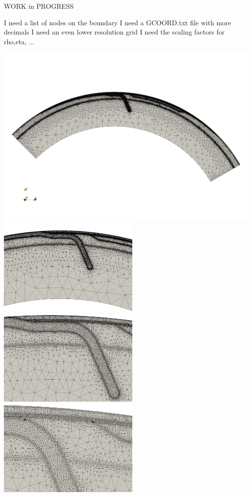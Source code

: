 

WORK in PROGRESS

I need a list of nodes on the boundary
I need a GCOORD.txt file with more decimals
I need an even lower resolution  grid
I need the scaling factors for rho,eta, ...


\includegraphics[width=14cm]{python_codes/fieldstone_44/grid_lowres1}\\
\includegraphics[width=7cm]{python_codes/fieldstone_44/grid_lowres2}
\includegraphics[width=7cm]{python_codes/fieldstone_44/grid_lowres3}\\
\includegraphics[width=7cm]{python_codes/fieldstone_44/grid_lowres4}
